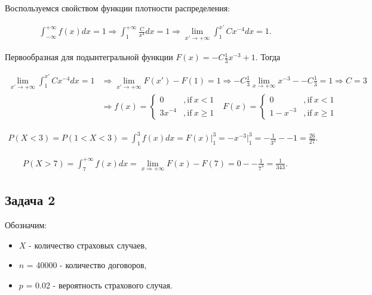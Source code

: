 \documentclass[a4paper,11pt]{article}
\begin{document}
Воспользуемся свойством функции плотности распределения:

\begin{align*}
\int_{-\infty}^{+\infty}f(x)dx = 1 
\Rightarrow 
\int_{1}^{+\infty}\frac{C}{x^4}dx = 1
\Rightarrow 
\lim_{x' \rightarrow +\infty} \int_{1}^{x'}Cx^{-4}dx = 1.
\end{align*}

Первообразная для подынтегральной функции $F(x) = -C\frac{1}{3}x^{-3} + 1$. Тогда

\begin{align*}
\lim_{x' \rightarrow +\infty} \int_{1}^{x'}Cx^{-4}dx = 1
& \Rightarrow 
\lim_{x' \rightarrow +\infty} F(x') - F(1) = 1
\Rightarrow 
-C\frac{1}{3} \lim_{x \rightarrow +\infty} x^{-3} - -C\frac{1}{3} = 1
\Rightarrow 
\boxed{C = 3} \\
& \Rightarrow 
f(x) = 
\begin{cases}
  0 & , \text{if}\ x < 1 \\
  3x^{-4} & , \text{if}\ x \geq 1
\end{cases}
\ \ \
F(x) = 
\begin{cases}
  0 & , \text{if}\ x < 1 \\
  1-x^{-3} & , \text{if}\ x \geq 1
\end{cases}
\end{align*}

\begin{align*}
P(X<3) = P(1 < X < 3) = \int_{1}^{3}f(x)dx = F(x)\rvert_1^3 = -x^{-3} \rvert_1^3 
= -\frac{1}{3^3} - -1 = \boxed{\frac{26}{27}}.
\end{align*}

\begin{align*}
P(X>7) = \int_{7}^{+\infty}f(x)dx = \lim_{x \Rightarrow +\infty} F(x) - F(7) = 0 - -\frac{1}{7^3} = \boxed{\frac{1}{343}}.
\end{align*}


\subsection{Задача 2}

Обозначим: 

\begin{itemize}
\item $X$ - количество страховых случаев,
\item $n$ = 40000 - количество договоров,
\item $p$ = 0.02 - вероятность страхового случая.
\end{itemize}
\end{document}
